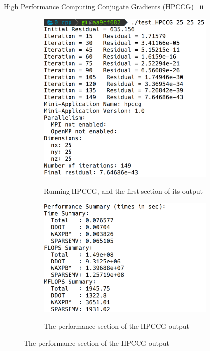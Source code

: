 \documentclass[10pt,aspectratio=169]{beamer}
\begin{document}
\begin{frame}{High Performance Computing Conjugate Gradients (HPCCG) \ ii}
    \begin{figure}
        \begin{subfigure}[t]{.45\textwidth}\centering
            \includegraphics[width=0.95\textwidth]{images/hpccg-run.png}
            \label{fig:hpccg-run}
            \captionsetup{width=0.95\textwidth}
            \caption{Running HPCCG, and the first section of its output}
        \end{subfigure}%
        \begin{subfigure}[t]{.45\textwidth}\centering
            \includegraphics[width=0.95\textwidth]{images/hpccg-perf.png}
            \label{fig:hpccg-perf}
            \captionsetup{width=0.95\textwidth}
            \caption{The performance section of the HPCCG output}
        \end{subfigure}
    \end{figure}
\end{frame}
\end{document}
